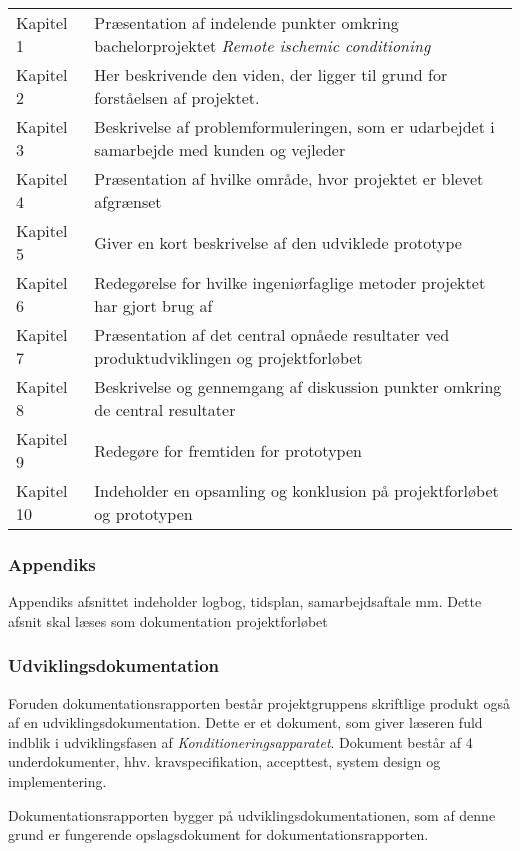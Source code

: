 	\begin{longtable}{ p{} p{} } 
		Kapitel 1 & Præsentation af indelende punkter omkring bachelorprojektet \textit{Remote ischemic conditioning}\\
		Kapitel 2 & Her beskrivende den viden, der ligger til grund for forståelsen af projektet. \\
		Kapitel 3 & Beskrivelse af problemformuleringen, som er udarbejdet i samarbejde med kunden og vejleder\\
		Kapitel 4 & Præsentation af hvilke område, hvor projektet er blevet afgrænset\\
		Kapitel 5 & Giver en kort beskrivelse af den udviklede prototype\\
		Kapitel 6 & Redegørelse for hvilke ingeniørfaglige metoder projektet har gjort brug af \\
		Kapitel 7 & Præsentation af det central opnåede resultater ved produktudviklingen og projektforløbet\\
		Kapitel 8 & Beskrivelse og gennemgang af diskussion punkter omkring de central resultater\\
		Kapitel 9 & Redegøre for fremtiden for prototypen\\
		Kapitel 10& Indeholder en opsamling og konklusion på projektforløbet og prototypen\\
	\end{longtable}

\subsubsection{Appendiks}
Appendiks afsnittet indeholder logbog, tidsplan, samarbejdsaftale mm. Dette afsnit skal læses som dokumentation projektforløbet

\subsubsection{Udviklingsdokumentation}
Foruden dokumentationsrapporten består projektgruppens skriftlige produkt også af en udviklingsdokumentation. Dette er et dokument, som giver læseren fuld indblik i udviklingsfasen af \textit{Konditioneringsapparatet}. Dokument består af 4 underdokumenter, hhv. kravspecifikation, accepttest, system design og implementering. 

Dokumentationsrapporten bygger på udviklingsdokumentationen, som af denne grund er fungerende opslagsdokument for dokumentationsrapporten. 



